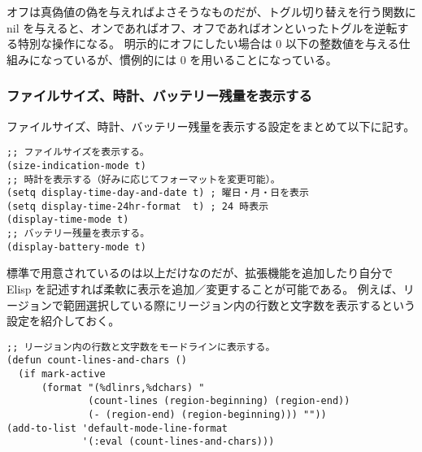 オフは真偽値の偽を与えればよさそうなものだが、トグル切り替えを行う関数に nil を与えると、オンであればオフ、オフであればオンといったトグルを逆転する特別な操作になる。
明示的にオフにしたい場合は 0 以下の整数値を与える仕組みになっているが、慣例的には 0 を用いることになっている。
\subsubsection{ファイルサイズ、時計、バッテリー残量を表示する}
ファイルサイズ、時計、バッテリー残量を表示する設定をまとめて以下に記す。
\begin{mdframed}[roundcorner=0.50zw,leftmargin=3.00zw,rightmargin=3.00zw,skipabove=0.40zw,skipbelow=0.40zw,innertopmargin=4.00pt,innerbottommargin=4.00pt,innerleftmargin=5.00pt,innerrightmargin=5.00pt,linecolor=gray!020,linewidth=0.50pt,backgroundcolor=gray!20]
\begin{verbatim}
;; ファイルサイズを表示する。
(size-indication-mode t)
;; 時計を表示する（好みに応じてフォーマットを変更可能）。
(setq display-time-day-and-date t) ; 曜日・月・日を表示
(setq display-time-24hr-format  t) ; 24 時表示
(display-time-mode t)
;; バッテリー残量を表示する。
(display-battery-mode t)
\end{verbatim}
\end{mdframed}
標準で用意されているのは以上だけなのだが、拡張機能を追加したり自分で Elisp を記述すれば柔軟に表示を追加／変更することが可能である。
例えば、リージョンで範囲選択している際にリージョン内の行数と文字数を表示するという設定を紹介しておく。
\begin{mdframed}[roundcorner=0.50zw,leftmargin=3.00zw,rightmargin=3.00zw,skipabove=0.40zw,skipbelow=0.40zw,innertopmargin=4.00pt,innerbottommargin=4.00pt,innerleftmargin=5.00pt,innerrightmargin=5.00pt,linecolor=gray!020,linewidth=0.50pt,backgroundcolor=gray!20]
\begin{verbatim}
;; リージョン内の行数と文字数をモードラインに表示する。
(defun count-lines-and-chars ()
  (if mark-active
      (format "(%dlinrs,%dchars) "
              (count-lines (region-beginning) (region-end))
              (- (region-end) (region-beginning))) ""))
(add-to-list 'default-mode-line-format
             '(:eval (count-lines-and-chars)))
\end{verbatim}
\end{mdframed}
